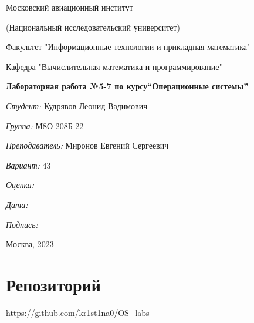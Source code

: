 \documentclass[a4paper, 12pt]{article}
\begin{document}
\thispagestyle{empty}	
\begin{center}
	Московский авиационный институт
	
	(Национальный исследовательский университет)
	
	Факультет "Информационные технологии и прикладная математика"
	
	Кафедра "Вычислительная математика и программирование"
	
\end{center}
\vspace{40ex}
\begin{center}
	\textbf{\large{Лабораторная работа №5-7 по курсу\linebreak \textquotedblleft Операционные системы\textquotedblright}}
\end{center}
\vspace{35ex}
\begin{flushright}
	\textit{Студент: } Кудрявов Леонид Вадимович
	
	\vspace{2ex}
	\textit{Группа: } М8О-208Б-22
	
	\vspace{2ex}
	\textit{Преподаватель: } Миронов Евгений Сергеевич
	
	\vspace{2ex}
	\textit{Вариант: } 43
	
	\vspace{2ex}
	\textit{Оценка: } \underline{\quad\quad\quad\quad\quad\quad}
	
	 \vspace{2ex}
	\textit{Дата: } \underline{\quad\quad\quad\quad\quad\quad}
	
	\vspace{2ex}
	\textit{Подпись: } \underline{\quad\quad\quad\quad\quad\quad}
	
\end{flushright}

\vspace{5ex}

\begin{vfill}
	\begin{center}
		Москва, 2023
	\end{center}	
\end{vfill}
\newpage

\begingroup
\color{black}
\tableofcontents\newpage
\endgroup

\section{Репозиторий}
\href{https://github.com/kr1st1na0/OS\_labs}{https://github.com/kr1st1na0/OS\_labs}
\end{document}
